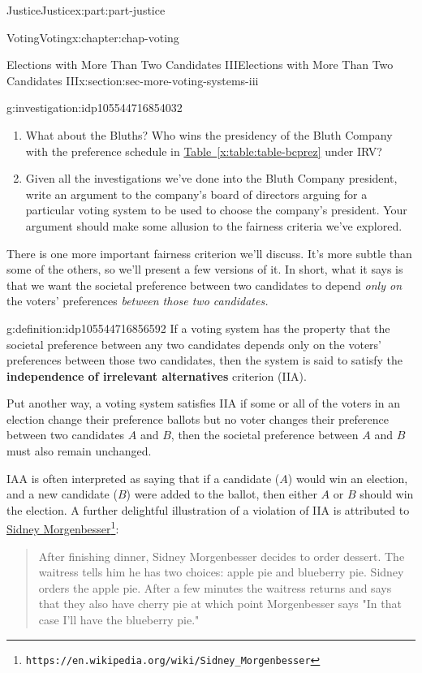 \documentclass[oneside,10pt,]{book}
\newcommand{\xreffont}{\relax}
\newcommand{\terminology}[1]{\textbf{#1}}
\numberwithin{equation}{section}
\begin{document}
\begin{partptx}{Justice}{}{Justice}{}{}{x:part:part-justice}
\begin{chapterptx}{Voting}{}{Voting}{}{}{x:chapter:chap-voting}
\begin{sectionptx}{Elections with More Than Two Candidates III}{}{Elections with More Than Two Candidates III}{}{}{x:section:sec-more-voting-systems-iii}
\begin{investigation}{}{g:investigation:idp105544716854032}
%
\begin{enumerate}
\item{}What about the Bluths? Who wins the presidency of the Bluth Company with the preference schedule in \hyperref[x:table:table-bcprez]{Table~{\xreffont\ref{x:table:table-bcprez}}} under IRV?%
\item{}Given all the investigations we've done into the Bluth Company president, write an argument to the company's board of directors arguing for a particular voting system to be used to choose the company's president. Your argument should make some allusion to the fairness criteria we've explored.%
\end{enumerate}
\end{investigation}%
There is one more important fairness criterion we'll discuss. It's more subtle than some of the others, so we'll present a few versions of it. In short, what it says is that we want the societal preference between two candidates to depend \emph{only on} the voters' preferences \emph{between those two candidates.}%
\begin{definition}{}{g:definition:idp105544716856592}%
If a voting system has the property that the societal preference between any two candidates depends only on the voters' preferences between those two candidates, then the system is said to satisfy the \terminology{independence of irrelevant alternatives} criterion (IIA).%
\par
Put another way, a voting system satisfies IIA if some or all of the voters in an election change their preference ballots but no voter changes their preference between two candidates \(A\) and \(B\), then the societal preference between \(A\) and \(B\) must also remain unchanged.%
\end{definition}
IAA is often interpreted as saying that if a candidate (\(A\)) would win an election, and a new candidate (\(B\)) were added to the ballot, then either \(A\) or \(B\) should win the election. A further delightful illustration of a violation of IIA is attributed to \href{https://en.wikipedia.org/wiki/Sidney_Morgenbesser}{Sidney Morgenbesser}\footnote{\nolinkurl{https://en.wikipedia.org/wiki/Sidney_Morgenbesser}\label{g:fn:idp105544716861328}}:%
\begin{quote}%
After finishing dinner, Sidney Morgenbesser decides to order dessert. The waitress tells him he has two choices: apple pie and blueberry pie. Sidney orders the apple pie. After a few minutes the waitress returns and says that they also have cherry pie at which point Morgenbesser says "In that case I'll have the blueberry pie."\end{quote}

\end{sectionptx}
\end{chapterptx}
\end{partptx}
\end{document}
